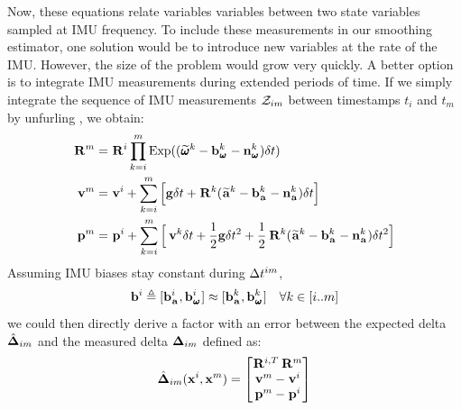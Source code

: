 Now, these equations relate variables variables between two state variables sampled at IMU frequency. To include these measurements in our smoothing estimator,
one solution would be to introduce new variables at the rate of the IMU. However, the size of the problem would grow very quickly. A better option
is to integrate IMU measurements during extended periods of time. If we simply integrate the sequence of IMU measurements $\mathcal{Z}_{im}$ between timestamps 
$t_i$ and $t_m$ by unfurling , we obtain:
%
\begin{equation}
    \begin{split}
    \prescript{}{}{{\bf R}}_{}^{m}  &= \prescript{}{}{{\bf R}}_{}^{i} \prod_{k=i}^{m} \operatorname*{Exp}((\prescript{}{}{\widetilde{\pmb{\omega}}}_{}^k - {\bf b}_{\prescript{}{}{\pmb{\omega}}_{}}^k - {\bf n}_{\prescript{}{}{\pmb{\omega}}_{}}^k)\delta t) \\
    \prescript{}{}{{\bf v}}_{}^{m}  &= \prescript{}{}{{\bf v}}_{}^{i} + \sum_{k=i}^{m} \Big[{\bf g} \delta t + \prescript{}{}{{\bf R}}_{}^{k}(\prescript{}{}{\widetilde{{\bf a}}}_{}^k - {\bf b}_{\prescript{}{}{{\bf a}}_{}}^k - {\bf n}_{\prescript{}{}{{\bf a}}_{}}^k)\delta t \Big]  \\
    \prescript{}{}{{\bf p}}_{}^{m} &= \prescript{}{}{{\bf p}}_{}^{i} + \sum_{k=i}^{m} \Big[\prescript{}{}{{\bf v}}_{}^{k}\delta t + \frac{1}{2}{\bf g} \delta t^2 
    + \frac{1}{2}\prescript{}{}{{\bf R}}_{}^{k}(\prescript{}{}{\widetilde{{\bf a}}}_{}^k - {\bf b}_{\prescript{}{}{{\bf a}}_{}}^k - {\bf n}_{\prescript{}{}{{\bf a}}_{}}^k)\delta t^2 \Big]
    \end{split}
    \label{eq:IMUIntij}
\end{equation}
%
Assuming IMU biases stay constant during $\Delta t^{im}$, 
\begin{equation*}
    {\bf b}^i \triangleq [{\bf b}_{\prescript{}{}{{\bf a}}_{}}^i, {\bf b}_{\prescript{}{}{\pmb{\omega}}_{}}^i] \approx [{\bf b}_{\prescript{}{}{{\bf a}}_{}}^k, {\bf b}_{\prescript{}{}{\pmb{\omega}}_{}}^k]  ~~~ \forall k \in [i..m]
\end{equation*}
%
we could then directly derive a factor with an error between the expected delta $\hat{{\bm \Delta}}_{im}$ and the measured delta ${\bm \Delta}_{im}$ defined as:
%
\begin{align}
    \hat{{\bm \Delta}}_{im}({\bf x}^i, {\bf x}^m) = 
    \begin{bmatrix}
    \prescript{}{}{{\bf R}}_{}^{i,T} \prescript{}{}{{\bf R}}_{}^{m}  \\
    \prescript{}{}{{\bf v}}_{}^{m}  - \prescript{}{}{{\bf v}}_{}^{i}  \\
    \prescript{}{}{{\bf p}}_{}^{m} - \prescript{}{}{{\bf p}}_{}^{i}
    \end{bmatrix}
\end{align}

